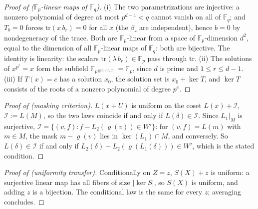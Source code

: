 \documentclass{article}
\newcommand{\Fp}{\mathbb{F}_p}
\newcommand{\Fq}{\mathbb{F}_q}
\newcommand{\extdeg}{d}
\theoremstyle{definition}
\begin{document}
\begin{proof}[Proof of  ($\Fp$-linear maps of $\Fq$)]
(i) The two parametrizations are injective: a nonzero polynomial of degree at most $p^{\extdeg - 1} < q$ cannot vanish on all of $\Fq$; and $T_b = 0$ forces $\mathrm{tr}(x\, b_r) = 0$ for all $x$ (the $\beta_r$ are independent), hence $b = 0$ by nondegeneracy of the trace. Both are $\Fp$-linear from a space of $\Fp$-dimension $\extdeg^2$, equal to the dimension of all $\Fp$-linear maps of $\Fq$: both are bijective. The identity is linearity: the scalars $\mathrm{tr}(\lambda\, b_r) \in \Fp$ pass through $\mathrm{tr}$. (ii) The solutions of $x^{p^r} = x$ form the subfield $\mathbb{F}_{p^{\gcd(r, \extdeg)}} = \Fp$, since $\extdeg$ is prime and $1 \leq r \leq \extdeg - 1$. (iii) If $T(x) = c$ has a solution $x_0$, the solution set is $x_0 + \ker T$, and $\ker T$ consists of the roots of a nonzero polynomial of degree $p^e$.
\end{proof}

\begin{proof}[Proof of  (masking criterion)]
$L(x + U)$ is uniform on the coset $L(x) + \mathcal{I}$, $\mathcal{I} := L(M)$, so the two laws coincide if and only if $L(\delta) \in \mathcal{I}$. Since $L_1|_M$ is surjective, $\mathcal{I} = \{(v, f) : f - L_2(\varrho(v)) \in W'\}$: for $(v, f) = L(m)$ with $m \in M$, the mask $m - \varrho(v)$ lies in $\ker(L_1) \cap M$, and conversely. So $L(\delta) \in \mathcal{I}$ if and only if $L_2(\delta) - L_2(\varrho(L_1(\delta))) \in W'$, which is the stated condition.
\end{proof}

\begin{proof}[Proof of  (uniformity transfer)]
Conditionally on $Z = z$, $S(X) + z$ is uniform: a surjective linear map has all fibers of size $|\ker S|$, so $S(X)$ is uniform, and adding $z$ is a bijection. The conditional law is the same for every $z$; averaging concludes.
\end{proof}



\end{document}
